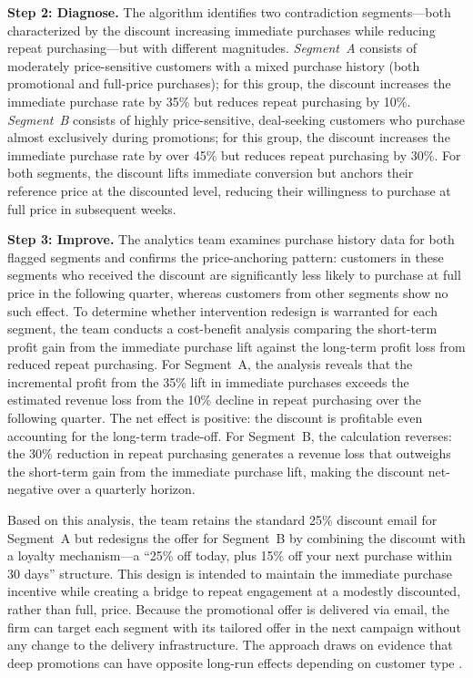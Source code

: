 \documentclass[11pt,letterpaper,english]{article}
\theoremstyle{definition}
\theoremstyle{definition}
\begin{document}
\begin{bibunit}
\vspace{4pt}
\noindent
\textbf{Step 2: Diagnose.}
The algorithm identifies two contradiction segments---both characterized by the discount increasing immediate purchases while reducing repeat purchasing---but with different magnitudes. \emph{Segment~A} consists of moderately price-sensitive customers with a mixed purchase history (both promotional and full-price purchases); for this group, the discount increases the immediate purchase rate by 35\% but reduces repeat purchasing by 10\%. \emph{Segment~B} consists of highly price-sensitive, deal-seeking customers who purchase almost exclusively during promotions; for this group, the discount increases the immediate purchase rate by over 45\% but reduces repeat purchasing by 30\%. For both segments, the discount lifts immediate conversion but anchors their reference price at the discounted level, reducing their willingness to purchase at full price in subsequent weeks.

\vspace{4pt}
\noindent
\textbf{Step 3: Improve.}
The analytics team examines purchase history data for both flagged segments and confirms the price-anchoring pattern: customers in these segments who received the discount are significantly less likely to purchase at full price in the following quarter, whereas customers from other segments show no such effect. To determine whether intervention redesign is warranted for each segment, the team conducts a cost-benefit analysis comparing the short-term profit gain from the immediate purchase lift against the long-term profit loss from reduced repeat purchasing. For Segment~A, the analysis reveals that the incremental profit from the 35\% lift in immediate purchases exceeds the estimated revenue loss from the 10\% decline in repeat purchasing over the following quarter. The net effect is positive: the discount is profitable even accounting for the long-term trade-off. For Segment~B, the calculation reverses: the 30\% reduction in repeat purchasing generates a revenue loss that outweighs the short-term gain from the immediate purchase lift, making the discount net-negative over a quarterly horizon.

Based on this analysis, the team retains the standard 25\% discount email for Segment~A but redesigns the offer for Segment~B by combining the discount with a loyalty mechanism---a ``25\% off today, plus 15\% off your next purchase within 30 days'' structure. This design is intended to maintain the immediate purchase incentive while creating a bridge to repeat engagement at a modestly discounted, rather than full, price. Because the promotional offer is delivered via email, the firm can target each segment with its tailored offer in the next campaign without any change to the delivery infrastructure. The approach draws on evidence that deep promotions can have opposite long-run effects depending on customer type \citep{anderson2004longrun}.


\end{bibunit}
\end{document}
